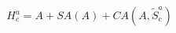 \begin{equation}
\label{eq:conditioned-audio}
{H}_{c}^{a}=A+SA(A)+CA\left( A,{\widetilde{S}}_{c}^{a}\right) 
\end{equation}
